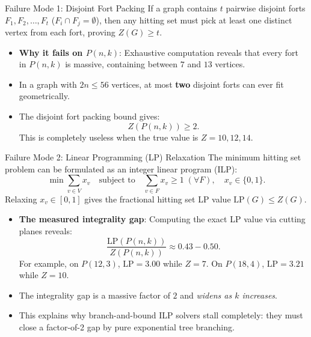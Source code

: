 \documentclass[11pt]{article}
\begin{document}
\begin{callbox}{Failure Mode 1: Disjoint Fort Packing}
If a graph contains $t$ pairwise disjoint forts $F_1, F_2, \dots, F_t$ ($F_i \cap F_j = \emptyset$), then any hitting set must pick at least one distinct vertex from each fort, proving $Z(G) \ge t$.
\begin{itemize}[leftmargin=*,nosep]
  \item \textbf{Why it fails on $P(n,k)$}: Exhaustive computation reveals that every fort in $P(n,k)$ is massive, containing between $7$ and $13$ vertices.
  \item In a graph with $2n \le 56$ vertices, at most \textbf{two} disjoint forts can ever fit geometrically.
  \item The disjoint fort packing bound gives:
  \begin{equation}
    Z(P(n,k)) \ge 2.
  \end{equation}
  This is completely useless when the true value is $Z = 10, 12, 14$.
\end{itemize}
\end{callbox}

\begin{callbox}{Failure Mode 2: Linear Programming (LP) Relaxation}
The minimum hitting set problem can be formulated as an integer linear program (ILP):
\begin{equation}
  \min \sum_{v \in V} x_v \quad \text{subject to} \quad \sum_{v \in F} x_v \ge 1 \; (\forall F), \quad x_v \in \{0, 1\}.
\end{equation}
Relaxing $x_v \in [0, 1]$ gives the fractional hitting set LP value $\mathrm{LP}(G) \le Z(G)$.
\begin{itemize}[leftmargin=*,nosep]
  \item \textbf{The measured integrality gap}: Computing the exact LP value via cutting planes reveals:
  \begin{equation}
    \frac{\mathrm{LP}(P(n,k))}{Z(P(n,k))} \approx 0.43 - 0.50.
  \end{equation}
  For example, on $P(12,3)$, $\mathrm{LP} = 3.00$ while $Z = 7$. On $P(18,4)$, $\mathrm{LP} = 3.21$ while $Z = 10$.
  \item The integrality gap is a massive factor of $2$ and \emph{widens as $k$ increases}.
  \item This explains why branch-and-bound ILP solvers stall completely: they must close a factor-of-2 gap by pure exponential tree branching.
\end{itemize}
\end{callbox}
\end{document}
